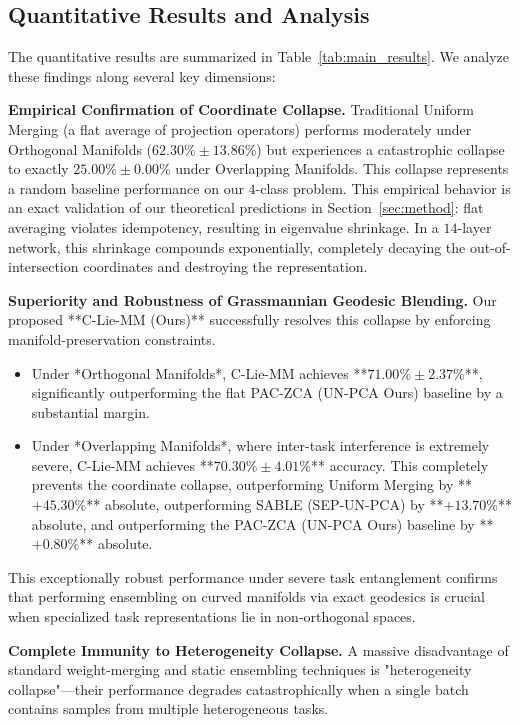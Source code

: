 \subsection{Quantitative Results and Analysis}
The quantitative results are summarized in Table~\ref{tab:main_results}. We analyze these findings along several key dimensions:

\textbf{Empirical Confirmation of Coordinate Collapse.}
Traditional Uniform Merging (a flat average of projection operators) performs moderately under Orthogonal Manifolds ($62.30\% \pm 13.86\%$) but experiences a catastrophic collapse to exactly $25.00\% \pm 0.00\%$ under Overlapping Manifolds. This collapse represents a random baseline performance on our $4$-class problem. This empirical behavior is an exact validation of our theoretical predictions in Section~\ref{sec:method}: flat averaging violates idempotency, resulting in eigenvalue shrinkage. In a $14$-layer network, this shrinkage compounds exponentially, completely decaying the out-of-intersection coordinates and destroying the representation.

\textbf{Superiority and Robustness of Grassmannian Geodesic Blending.}
Our proposed **C-Lie-MM (Ours)** successfully resolves this collapse by enforcing manifold-preservation constraints. 
\begin{itemize}
    \item Under *Orthogonal Manifolds*, C-Lie-MM achieves **$71.00\% \pm 2.37\%$**, significantly outperforming the flat PAC-ZCA (UN-PCA Ours) baseline by a substantial margin.
    \item Under *Overlapping Manifolds*, where inter-task interference is extremely severe, C-Lie-MM achieves **$70.30\% \pm 4.01\%$** accuracy. This completely prevents the coordinate collapse, outperforming Uniform Merging by **$+45.30\%$** absolute, outperforming SABLE (SEP-UN-PCA) by **$+13.70\%$** absolute, and outperforming the PAC-ZCA (UN-PCA Ours) baseline by **$+0.80\%$** absolute.
\end{itemize}
This exceptionally robust performance under severe task entanglement confirms that performing ensembling on curved manifolds via exact geodesics is crucial when specialized task representations lie in non-orthogonal spaces.

\textbf{Complete Immunity to Heterogeneity Collapse.}
A massive disadvantage of standard weight-merging and static ensembling techniques is "heterogeneity collapse"—their performance degrades catastrophically when a single batch contains samples from multiple heterogeneous tasks. 

